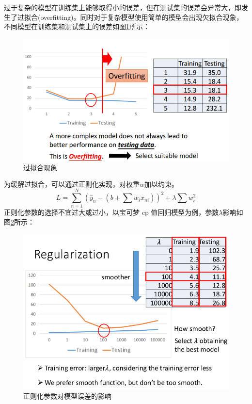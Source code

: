 过于复杂的模型在训练集上能够取得小的误差，但在测试集的误差会异常大，即发生了过拟合(overfitting)。同时对于复杂模型使用简单的模型会出现欠拟合现象，不同模型在训练集和测试集上的误差如图\ref{fig:overfitting}所示：
\begin{figure}
	\centering
	\includegraphics[scale=0.5]{pic/overfitting.png}
	\caption{过拟合现象}
	\label{fig:overfitting}
\end{figure}
为缓解过拟合，可以通过正则化实现，对权重$w$加以约束。
\[
	L = \sum_{n=1}^{N} \left(\hat{y}_n - (b+ \sum w_i x_{ni}) \right) ^2 + \lambda  \sum w_i^2 
\]
正则化参数的选择不宜过大或过小，以宝可梦 cp 值回归模型为例，参数$\lambda$影响如图\ref{fig:regularization}所示：
\begin{figure}
	\centering
	\includegraphics[scale=0.5]{pic/regularization.png}
	\caption{正则化参数对模型误差的影响}
	\label{fig:regularization}
\end{figure}
